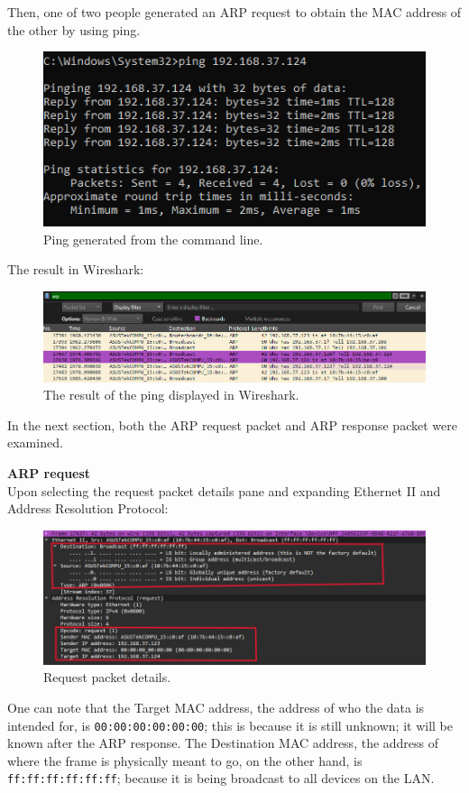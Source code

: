 \documentclass[a4paper,12pt]{article}
\begin{document}
Then, one of two people generated an ARP request to obtain the MAC address of the other by using ping.
\begin{figure}[H]
\centering
\includegraphics[width=\linewidth,keepaspectratio]{Pictures_Lab1/ping cmd.png}
\caption{Ping generated from the command line.}
\end{figure}

The result in Wireshark:
\begin{figure}[H]
\centering
\includegraphics[width=\linewidth,keepaspectratio]{Pictures_Lab1/pinged.png}
\caption{The result of the ping displayed in Wireshark.}
\end{figure}


In the next section, both the ARP request packet and ARP response packet were examined.
\pagebreak

\textbf{ARP request} \\
Upon selecting the request packet details pane and expanding Ethernet II and Address Resolution Protocol:
\begin{figure}[H]
\centering
\includegraphics[width=\linewidth,keepaspectratio]{Pictures_Lab1/ethernet 2 and other thing ss .png}
\caption{Request packet details.}
\end{figure}
One can note that the Target MAC address, the address of who the data is intended for, is \texttt{00:00:00:00:00:00}; this is because it is still unknown; it will be known after the ARP response.
The Destination MAC address, the address of where the frame is physically meant to go, on the other hand, is \texttt{ff:ff:ff:ff:ff:ff}; because it is being broadcast to all devices on the LAN.
\vspace{1em}
\end{document}
